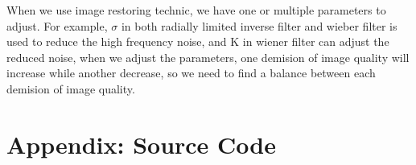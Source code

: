 \documentclass[
	12pt, %
]{style/fphw}
\begin{document}
When we use image restoring technic, we have one or multiple parameters to adjust. For example, $\sigma$ in both radially limited inverse filter and wieber filter is used to reduce the high frequency noise, and K in wiener filter can adjust the reduced noise, when we adjust the parameters, one demision of image quality will increase while another decrease, so we need to find a balance between each demision of image quality.

\newpage
\section*{Appendix: Source Code}

\inputminted[linenos,breaklines, breakafter=d, bgcolor=bg]{python}{code/adaptive_filter_11810818.py}

\inputminted[linenos,breaklines, breakafter=d, bgcolor=bg]{python}{code/restoration_11810818.py}

\inputminted[linenos,breaklines, breakafter=d, bgcolor=bg]{python}{code/undergo_denoise_11810818.py}

\inputminted[linenos,breaklines, breakafter=d, bgcolor=bg]{python}{code/EE326_SUSTech.py}
\end{document}
